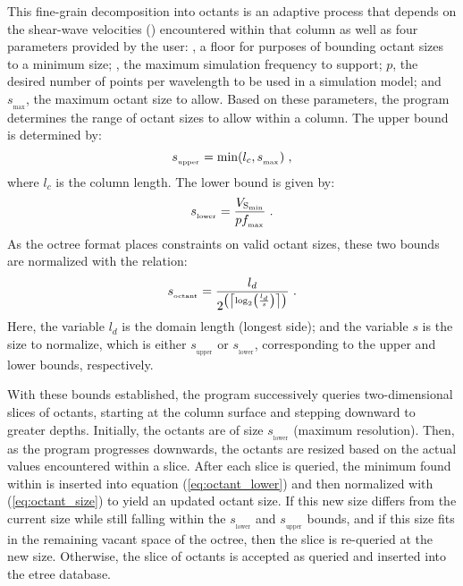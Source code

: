 This fine-grain decomposition into octants is an adaptive process that depends on the shear-wave velocities (\vs{}) encountered within that column as well as four parameters provided by the user: \vsmin{}, a floor \vs{} for purposes of bounding octant sizes to a minimum size; \fmax{}, the maximum simulation frequency to support; $p$, the desired number of points per wavelength to be used in a simulation model; and $s_{_{\max}}$, the maximum octant size to allow. Based on these parameters, the program determines the range of octant sizes to allow within a column. The upper bound is determined by:
%
\begin{equation}
\label{eq:octant_upper}
	s_{_{\mathrm{upper}}} = \min ( l_c, s_{_{\max}} )
	\hspace{0.3em},
\end{equation}
%
where $l_c$ is the column length. The lower bound is given by:
%
\begin{equation}
\label{eq:octant_lower}
	s_{_{\mathrm{lower}}} = \frac{ V_{\mathrm{S}_{\min}} }{ p f_{_{\max}}}
	\hspace{0.3em}.
\end{equation}
%
As the octree format places constraints on valid octant sizes, these two bounds are normalized with the relation:
%
\begin{equation}
\label{eq:octant_size}
	s_{_{\mathrm{octant}}} = \frac{ l_d }{ 2^{ \left( \left\lceil \log_{2} \left( \frac{l_d}{s} \right) \right\rceil \right)} }
	\hspace{0.3em}.
\end{equation}
%
Here, the variable $l_d$ is the domain length (longest side); and the variable $s$ is the size to normalize, which is either $s_{_{\mathrm{upper}}}$ or $s_{_{\mathrm{lower}}}$, corresponding to the upper and lower bounds, respectively.

With these bounds established, the program successively queries two-dimensional slices of octants, starting at the column surface and stepping downward to greater depths. Initially, the octants are of size $s_{_{\mathrm{lower}}}$ (maximum resolution). Then, as the program progresses downwards, the octants are resized based on the actual \vs{} values encountered within a slice. After each slice is queried, the minimum \vs{} found within is inserted into equation (\ref{eq:octant_lower}) and then normalized with (\ref{eq:octant_size}) to yield an updated octant size. If this new size differs from the current size while still falling within the $s_{_{\mathrm{lower}}}$ and $s_{_{\mathrm{upper}}}$ bounds, and if this size fits in the remaining vacant space of the octree, then the slice is re-queried at the new size. Otherwise, the slice of octants is accepted as queried and inserted into the etree database.

